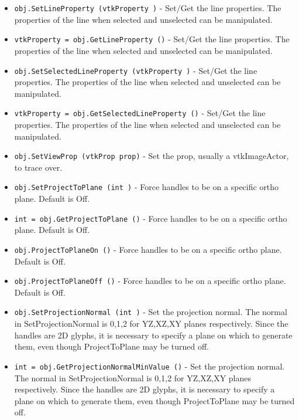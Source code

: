 \begin{itemize}
\item  \verb|obj.SetLineProperty (vtkProperty )| -  Set/Get the line properties. The properties of the line when selected
 and unselected can be manipulated.

\item  \verb|vtkProperty = obj.GetLineProperty ()| -  Set/Get the line properties. The properties of the line when selected
 and unselected can be manipulated.

\item  \verb|obj.SetSelectedLineProperty (vtkProperty )| -  Set/Get the line properties. The properties of the line when selected
 and unselected can be manipulated.

\item  \verb|vtkProperty = obj.GetSelectedLineProperty ()| -  Set/Get the line properties. The properties of the line when selected
 and unselected can be manipulated.

\item  \verb|obj.SetViewProp (vtkProp prop)| -  Set the prop, usually a vtkImageActor, to trace over.

\item  \verb|obj.SetProjectToPlane (int )| -  Force handles to be on a specific ortho plane. Default is Off.

\item  \verb|int = obj.GetProjectToPlane ()| -  Force handles to be on a specific ortho plane. Default is Off.

\item  \verb|obj.ProjectToPlaneOn ()| -  Force handles to be on a specific ortho plane. Default is Off.

\item  \verb|obj.ProjectToPlaneOff ()| -  Force handles to be on a specific ortho plane. Default is Off.

\item  \verb|obj.SetProjectionNormal (int )| -  Set the projection normal.  The normal in SetProjectionNormal is 0,1,2
 for YZ,XZ,XY planes respectively.  Since the handles are 2D glyphs, it is
 necessary to specify a plane on which to generate them, even though
 ProjectToPlane may be turned off.

\item  \verb|int = obj.GetProjectionNormalMinValue ()| -  Set the projection normal.  The normal in SetProjectionNormal is 0,1,2
 for YZ,XZ,XY planes respectively.  Since the handles are 2D glyphs, it is
 necessary to specify a plane on which to generate them, even though
 ProjectToPlane may be turned off.


\end{itemize}
